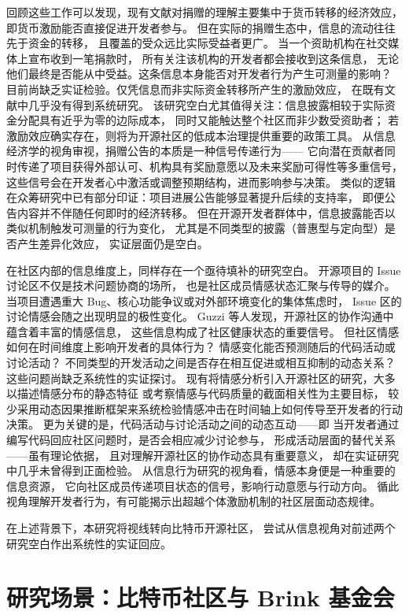 \documentclass[
    type = master, %
    degree = professional,        %
    decl-page,  %
    twoside,                %
    fontset = fandol %
  ]{njuthesis}
\begin{document}
回顾这些工作可以发现，现有文献对捐赠的理解主要集中于货币转移的经济效应，
即货币激励能否直接促进开发者参与。
但在实际的捐赠生态中，信息的流动往往先于资金的转移，
且覆盖的受众远比实际受益者更广。
当一个资助机构在社交媒体上宣布收到一笔捐款时，
所有关注该机构的开发者都会接收到这条信息，
无论他们最终是否能从中受益。这条信息本身能否对开发者行为产生可测量的影响？
目前尚缺乏实证检验。仅凭信息而非实际资金转移所产生的激励效应，
在既有文献中几乎没有得到系统研究。
该研究空白尤其值得关注：信息披露相较于实际资金分配具有近乎为零的边际成本，
同时又能触达整个社区而非少数受资助者；
若激励效应确实存在，则将为开源社区的低成本治理提供重要的政策工具。
从信息经济学的视角审视，捐赠公告的本质是一种信号传递行为——
它向潜在贡献者同时传递了项目获得外部认可、机构具有奖励意愿以及未来奖励可得性等多重信号，
这些信号会在开发者心中激活或调整预期结构，进而影响参与决策\cite{connelly2011signaling}。
类似的逻辑在众筹研究中已有部分印证：项目进展公告能够显著提升后续的支持率，
即便公告内容并不伴随任何即时的经济转移\cite{mollick2014dynamics}。
但在开源开发者群体中，信息披露能否以类似机制触发可测量的行为变化，
尤其是不同类型的披露（普惠型与定向型）是否产生差异化效应，
实证层面仍是空白。

在社区内部的信息维度上，同样存在一个亟待填补的研究空白。
开源项目的 Issue 讨论区不仅是技术问题协商的场所，
也是社区成员情感状态汇聚与传导的媒介。
当项目遭遇重大 Bug、核心功能争议或对外部环境变化的集体焦虑时，
Issue 区的讨论情感会随之出现明显的极性变化。
Guzzi 等人\cite{guzzi2013}发现，开源社区的协作沟通中蕴含着丰富的情感信息，
这些信息构成了社区健康状态的重要信号。
但社区情感如何在时间维度上影响开发者的具体行为？
情感变化能否预测随后的代码活动或讨论活动？
不同类型的开发活动之间是否存在相互促进或相互抑制的动态关系？
这些问题尚缺乏系统性的实证探讨。
现有将情感分析引入开源社区的研究，大多以描述情感分布的静态特征
或考察情感与代码质量的截面相关性为主要目标\cite{guzzi2013}，
较少采用动态因果推断框架来系统检验情感冲击在时间轴上如何传导至开发者的行动决策。
更为关键的是，代码活动与讨论活动之间的动态互动——即
当开发者通过编写代码回应社区问题时，是否会相应减少讨论参与，
形成活动层面的替代关系——虽有理论依据，
且对理解开源社区的协作动态具有重要意义，
却在实证研究中几乎未曾得到正面检验。
从信息行为研究的视角看，情感本身便是一种重要的信息资源，
它向社区成员传递项目状态的信号，影响行动意愿与行动方向。
循此视角理解开发者行为，有可能揭示出超越个体激励机制的社区层面动态规律。

在上述背景下，本研究将视线转向比特币开源社区，
尝试从信息视角对前述两个研究空白作出系统性的实证回应。

\section{研究场景：比特币社区与 Brink 基金会}
\end{document}
